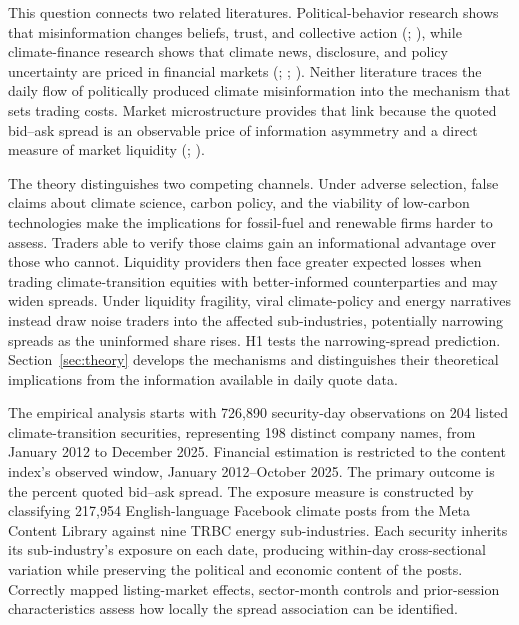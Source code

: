 \documentclass{article}
\theoremstyle{plain}
\begin{document}
This question connects two related literatures. Political-behavior research shows that misinformation changes beliefs, trust, and collective action (\cite{flynn2017misperceptions}; \cite{bursztyn2020misinformation}), while climate-finance research shows that climate news, disclosure, and policy uncertainty are priced in financial markets (\cite{engle2020hedging}; \cite{bolton2021climate}; \cite{pankratz2023climate}). Neither literature traces the daily flow of politically produced climate misinformation into the mechanism that sets trading costs. Market microstructure provides that link because the quoted bid--ask spread is an observable price of information asymmetry and a direct measure of market liquidity (\cite{GlostenMilgrom1985}; \cite{EasleyOHara1992}).

The theory distinguishes two competing channels. Under adverse selection, false claims about climate science, carbon policy, and the viability of low-carbon technologies make the implications for fossil-fuel and renewable firms harder to assess. Traders able to verify those claims gain an informational advantage over those who cannot. Liquidity providers then face greater expected losses when trading climate-transition equities with better-informed counterparties and may widen spreads. Under liquidity fragility, viral climate-policy and energy narratives instead draw noise traders into the affected sub-industries, potentially narrowing spreads as the uninformed share rises. H1 tests the narrowing-spread prediction. Section~\ref{sec:theory} develops the mechanisms and distinguishes their theoretical implications from the information available in daily quote data.

The empirical analysis starts with 726,890 security-day observations on 204 listed climate-transition securities, representing 198 distinct company names, from January 2012 to December 2025. Financial estimation is restricted to the content index's observed window, January 2012--October 2025. The primary outcome is the percent quoted bid--ask spread. The exposure measure is constructed by classifying 217,954 English-language Facebook climate posts from the Meta Content Library against nine TRBC energy sub-industries. Each security inherits its sub-industry's exposure on each date, producing within-day cross-sectional variation while preserving the political and economic content of the posts. Correctly mapped listing-market effects, sector-month controls and prior-session characteristics assess how locally the spread association can be identified.
\end{document}
